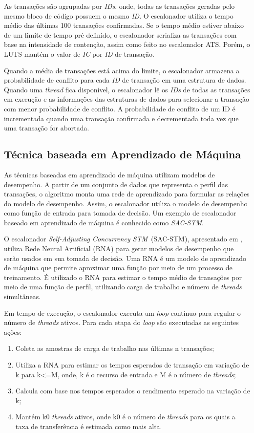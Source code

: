 \documentclass[ti]{texufpel}
\begin{document}
As transações são agrupadas por \emph{IDs}, onde, todas as transações geradas pelo mesmo bloco de código possuem o mesmo \emph{ID}. O escalonador utiliza o tempo médio das últimas 100 transações confirmadas. Se o tempo médio estiver abaixo de um limite de tempo pré definido, o escalonador serializa as transações com base na intensidade de contenção, assim como feito no escalonador ATS. Porém, o LUTS mantém o valor de \emph{IC} por \emph{ID} de transação.

Quando a média de transações está acima do limite, o escalonador armazena a probabilidade de conflito para cada \emph{ID} de transação em uma estrutura de dados. Quando uma \emph{thread} fica disponível, o escalonador lê os \emph{IDs} de todas as transações em execução e as informações das estruturas de dados para selecionar a transação com menor probabilidade de conflito. A probabilidade de conflito de um ID é incrementada quando uma transação confirmada e decrementada toda vez que uma transação for abortada.

\subsection{Técnica baseada em Aprendizado de Máquina}

As técnicas baseadas em aprendizado de máquina utilizam modelos de desempenho. A partir de um conjunto de dados que representa o perfil das transações, o algoritmo monta uma rede de aprendizado para formular as relações do modelo de desempenho. Assim, o escalonador utiliza o modelo de desempenho como função de entrada para tomada de decisão. Um exemplo de escalonador baseado em aprendizado de máquina é conhecido como \emph{SAC-STM}.

O escalonador \emph{Self-Adjusting Concurrency STM}~(SAC-STM), apresentado em \cite{rughetti12}, utiliza Rede Neural Artificial (RNA) para gerar modelos de desempenho que serão usados em sua tomada de decisão. Uma RNA é um modelo de aprendizado de máquina que permite aproximar uma função por meio de um processo de treinamento. É utilizado o RNA para estimar o tempo médio de transações por meio de uma função de perfil, utilizando carga de trabalho e número de \emph{threads} simultâneas.

Em tempo de execução, o escalonador executa um \emph{loop} contínuo para regular o número de \emph{threads} ativos. Para cada etapa do \emph{loop} são executadas as seguintes ações:

\begin{enumerate}
\item Coleta as amostras de carga de trabalho nas últimas n transações;
\item Utiliza a RNA para estimar os tempos esperados de transação em variação de k para k<=M, onde, k é o recurso de entrada e M é o número de \emph{threads};
\item Calcula com base nos tempos esperados o rendimento esperado na variação de k;
\item Mantém k0 \emph{threads} ativos, onde k0 é o número de \emph{threads} para os quais a taxa de transferência é estimada como mais alta.
\end{enumerate}
\end{document}
